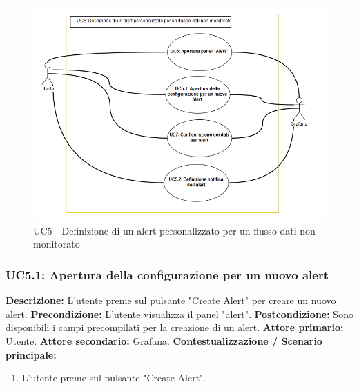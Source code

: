                         
                        \begin{figure}[!htbp]
                    	\centering
                    	\includegraphics[width=\textwidth]{UC5.png}
                    	\caption{UC5 - Definizione di un alert personalizzato per un flusso dati non monitorato}
                    	\label{uc5}
                    \end{figure} 
                    \clearpage
                \subsubsection{UC5.1: Apertura della configurazione per un nuovo alert}
                    \textbf{Descrizione:} L’utente preme sul pulsante "Create Alert" per creare un nuovo alert.
                    \newline
                    \textbf{Precondizione:} L'utente visualizza il panel "alert".
                    \newline
                    \textbf{Postcondizione:} Sono disponibili i campi precompilati per la creazione di un alert.
                    \newline
                    \textbf{Attore primario:} Utente.
                    \newline
                    \textbf{Attore secondario:} Grafana.
                    \newline
                    \textbf{Contestualizzazione / Scenario principale:} \begin{enumerate}
                            \item L’utente preme sul pulsante "Create Alert".
                        \end{enumerate}  
                        
